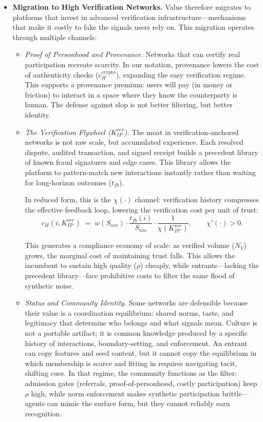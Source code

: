 \documentclass[12pt, letter]{article}
\begin{document}
\begin{itemize}
\item \textbf{Migration to High Verification Networks.} Value therefore migrates to platforms that invest in advanced verification infrastructure---mechanisms that make it costly to fake the signals users rely on. This migration operates through multiple channels:

\begin{itemize}
    \item \textit{Proof of Personhood and Provenance.} Networks that can certify real participation recreate scarcity. In our notation, provenance lowers the cost of authenticity checks ($c_H^{\text{crypto}}$), expanding the easy verification regime. This supports a provenance premium: users will pay (in money or friction) to interact in a space where they know the counterparty is human. The defense against slop is not better filtering, but better identity.

    \item \textit{The Verification Flywheel ($K_{IP}^{ver}$).} The moat in verification-anchored networks is not raw scale, but accumulated experience. Each resolved dispute, audited transaction, and signed receipt builds a precedent library of known fraud signatures and edge cases. This library allows the platform to pattern-match new interactions instantly rather than waiting for long-horizon outcomes ($t_{fb}$).

    In reduced form, this is the $\chi(\cdot)$ channel: verification history compresses the effective feedback loop, lowering the verification cost per unit of trust:
    \[
    c_H(i;K_{IP}^{ver}) \;=\; w(S_{nm})\cdot \frac{t_{fb}(i)}{S_{nm}}\cdot \frac{1}{\chi(K_{IP}^{ver})},
    \qquad \chi'(\cdot)>0.
    \]

    This generates a compliance economy of scale: as verified volume ($N_V$) grows, the marginal cost of maintaining trust falls. This allows the incumbent to sustain high quality ($\rho$) cheaply, while entrants—lacking the precedent library—face prohibitive costs to filter the same flood of synthetic noise.

    \item \textit{Status and Community Identity.} Some networks are defensible because their value is a coordination equilibrium: shared norms, taste, and legitimacy that determine who belongs and what signals mean. Culture is not a portable artifact; it is common knowledge produced by a specific history of interactions, boundary-setting, and enforcement. An entrant can copy features and seed content, but it cannot copy the equilibrium in which membership is scarce and fitting in requires navigating tacit, shifting cues. In that regime, the community functions as the filter: admission gates (referrals, proof-of-personhood, costly participation) keep $\rho$ high, while norm enforcement makes synthetic participation brittle—agents can mimic the surface form, but they cannot reliably earn recognition.
    
\end{itemize}
\end{itemize}
\end{document}
